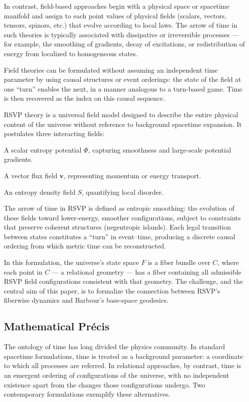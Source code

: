 \documentclass[11pt]{article}
\theoremstyle{plain}
\theoremstyle{definition}
\begin{document}
In contrast, field-based approaches begin with a physical space or spacetime manifold and assign to each point values of physical fields (scalars, vectors, tensors, spinors, etc.) that evolve according to local laws. The arrow of time in such theories is typically associated with dissipative or irreversible processes — for example, the smoothing of gradients, decay of excitations, or redistribution of energy from localized to homogeneous states.

Field theories can be formulated without assuming an independent time parameter by using causal structures or event orderings: the state of the field at one “turn” enables the next, in a manner analogous to a turn-based game. Time is then recovered as the index on this causal sequence.

RSVP theory is a universal field model designed to describe the entire physical content of the universe without reference to background spacetime expansion. It postulates three interacting fields:

A scalar entropy potential $\Phi$, capturing smoothness and large-scale potential gradients.

A vector flux field $\mathbf{v}$, representing momentum or energy transport.

An entropy density field $S$, quantifying local disorder.

The arrow of time in RSVP is defined as entropic smoothing: the evolution of these fields toward lower-energy, smoother configurations, subject to constraints that preserve coherent structures (negentropic islands). Each legal transition between states constitutes a “turn” in event–time, producing a discrete causal ordering from which metric time can be reconstructed.

In this formulation, the universe’s state space $F$ is a fiber bundle over $C$, where each point in $C$ — a relational geometry — has a fiber containing all admissible RSVP field configurations consistent with that geometry. The challenge, and the central aim of this paper, is to formalize the connection between RSVP’s fiberwise dynamics and Barbour’s base-space geodesics.

\subsection{Mathematical Précis}
The ontology of time has long divided the physics community. In standard spacetime formulations, time is treated as a background parameter: a coordinate to which all processes are referred. In relational approaches, by contrast, time is an emergent ordering of configurations of the universe, with no independent existence apart from the changes those configurations undergo. Two contemporary formulations exemplify these alternatives.
\end{document}
